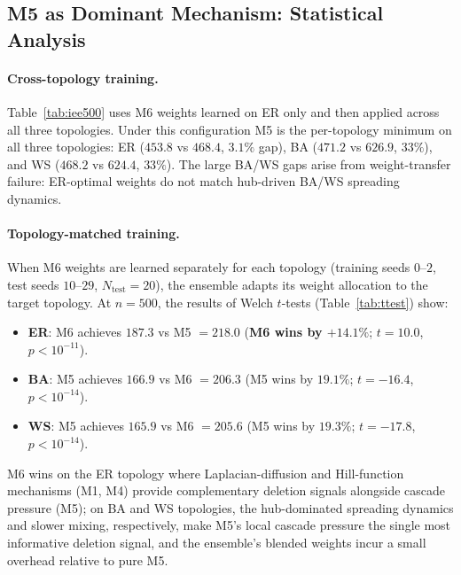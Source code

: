 \documentclass[review,12pt]{elsarticle}
\begin{document}
\subsection{M5 as Dominant Mechanism: Statistical Analysis}
\label{sec:iee_comparison}

\paragraph{Cross-topology training.}
Table~\ref{tab:iee500} uses M6 weights learned on ER only and then applied
across all three topologies.  Under this configuration M5 is the
per-topology minimum on all three topologies: ER ($453.8$ vs $468.4$,
$3.1\%$ gap), BA ($471.2$ vs $626.9$, $33\%$), and WS ($468.2$ vs $624.4$,
$33\%$).  The large BA/WS gaps arise from weight-transfer failure:
ER-optimal weights do not match hub-driven BA/WS spreading dynamics.

\paragraph{Topology-matched training.}
When M6 weights are learned separately for each topology (training seeds
$0$--$2$, test seeds $10$--$29$, $N_{\mathrm{test}}=20$), the ensemble
adapts its weight allocation to the target topology.  At $n=500$, the
results of Welch $t$-tests (Table~\ref{tab:ttest}) show:
\begin{itemize}
  \item \textbf{ER}: M6 achieves $187.3$ vs M5 $= 218.0$
        (\textbf{M6 wins by $+14.1\%$}; $t = 10.0$, $p < 10^{-11}$).
  \item \textbf{BA}: M5 achieves $166.9$ vs M6 $= 206.3$
        (M5 wins by $19.1\%$; $t = -16.4$, $p < 10^{-14}$).
  \item \textbf{WS}: M5 achieves $165.9$ vs M6 $= 205.6$
        (M5 wins by $19.3\%$; $t = -17.8$, $p < 10^{-14}$).
\end{itemize}
M6 wins on the ER topology where Laplacian-diffusion and Hill-function
mechanisms (M1, M4) provide complementary deletion signals alongside
cascade pressure (M5); on BA and WS topologies, the hub-dominated
spreading dynamics and slower mixing, respectively, make M5's local
cascade pressure the single most informative deletion signal, and the
ensemble's blended weights incur a small overhead relative to pure M5.
\end{document}
